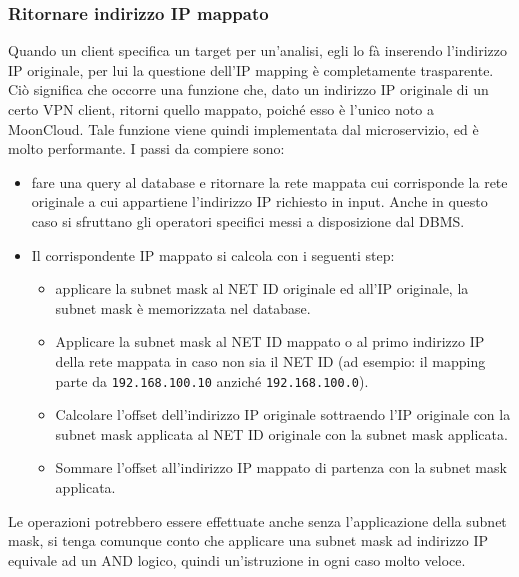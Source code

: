 \subsubsection{Ritornare indirizzo IP mappato}
Quando un client specifica un target per un'analisi, egli lo fà inserendo l'indirizzo
IP originale, per lui la questione dell'IP mapping è completamente trasparente. Ciò
significa che occorre una funzione che, dato un indirizzo IP originale di un
certo VPN client, ritorni quello mappato, poiché esso è l'unico noto a MoonCloud.
Tale funzione viene quindi implementata dal microservizio, ed è molto performante.
I passi da compiere sono:
\begin{itemize}
	\item fare una query al database e ritornare la rete mappata cui corrisponde
	      la rete originale a cui appartiene l'indirizzo IP richiesto in input.
	      Anche in questo caso si sfruttano gli operatori specifici messi a disposizione
	      dal DBMS.
	\item Il corrispondente IP mappato si calcola con i seguenti step:
	      \begin{itemize}
	      	\item applicare la subnet mask al NET ID originale ed all'IP originale,
	      	      la subnet mask è memorizzata nel database.
	      	\item Applicare la subnet mask al NET ID mappato o al primo indirizzo IP
	      	      della rete mappata in caso non sia il NET ID (ad esempio: il mapping
	      	      parte da \texttt{192.168.100.10} anziché \texttt{192.168.100.0}).
	      	\item Calcolare l'offset dell'indirizzo IP originale sottraendo
	      	      l'IP originale con la subnet mask applicata al NET ID originale
	      	      con la subnet mask applicata.
	      	\item Sommare l'offset all'indirizzo IP mappato di partenza con
	      	      la subnet mask applicata.
	      \end{itemize}
\end{itemize}
Le operazioni potrebbero essere effettuate anche senza l'applicazione della
subnet mask, si tenga comunque conto che applicare una subnet mask
ad indirizzo IP equivale ad un AND logico, quindi un'istruzione in ogni
caso molto veloce.


